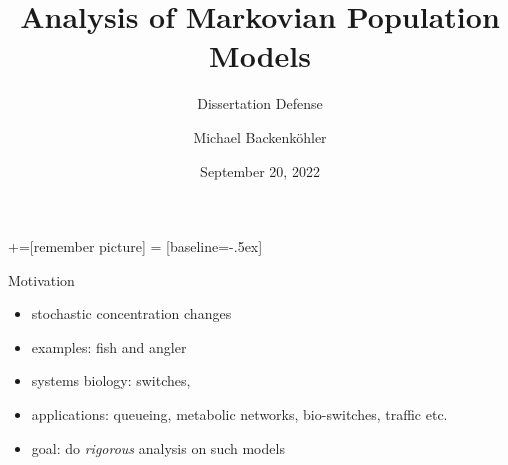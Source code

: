 \documentclass[9pt]{beamer}
\title{Analysis of Markovian Population Models}
\subtitle{Dissertation Defense}
\author{Michael Backenk\"{o}hler}
\institute{Saarland Informatics Campus}
\date{September 20, 2022}
\begin{document}
+=[remember picture]
 = [baseline=-.5ex]

\begin{frame}
\titlepage
\end{frame}

\begin{frame}{Motivation}
  \begin{itemize}
    \item stochastic concentration changes
    \item examples: fish and angler
    \item systems biology: switches, 
    \item applications: queueing, metabolic networks, bio-switches, traffic etc.
    \item goal: do \emph{rigorous} analysis on such models
  \end{itemize}
\end{frame}
\end{document}
